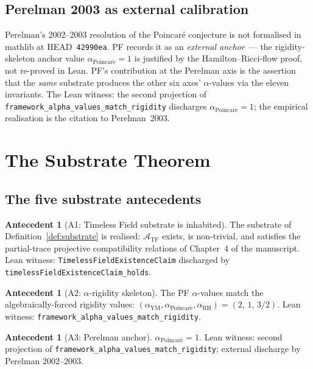 \documentclass[11pt,a4paper]{article}
\theoremstyle{definition}
\newtheorem{antecedent}[theorem]{Antecedent}
\theoremstyle{remark}
\newcommand{\TF}{\mathcal{A}_{\mathrm{TF}}}
\newcommand{\alphaRH}{\alpha_{\mathrm{RH}}}
\newcommand{\alphaYM}{\alpha_{\mathrm{YM}}}
\newcommand{\alphaP}{\alpha_{\mathrm{Poincar\acute{e}}}}
\newcommand{\lean}[1]{\texttt{\small #1}}
\begin{document}
\subsection{Perelman 2003 as external calibration}

Perelman's 2002--2003 resolution of the Poincar\'e conjecture is
not formalised in mathlib at HEAD~\texttt{42990ea}. PF records it
as an \emph{external anchor}~--- the rigidity-skeleton anchor
value $\alphaP = 1$ is justified by the
Hamilton--Ricci-flow proof, not re-proved in Lean. PF's
contribution at the Perelman axis is the assertion that the
\emph{same} substrate produces the other six axes' $\alpha$-values
via the eleven invariants. The Lean witness:
the second projection of \lean{framework\_alpha\_values\_match\_rigidity}
discharges $\alphaP = 1$; the empirical realisation is the citation
to Perelman~2003.

\section{The Substrate Theorem}
\label{sec:substrate-theorem}

\subsection{The five substrate antecedents}
\label{sec:antecedents}

\begin{antecedent}[A1: Timeless Field substrate is inhabited]
The substrate of Definition~\ref{def:substrate} is realised:
$\TF$ exists, is non-trivial, and satisfies the partial-trace
projective compatibility relations of Chapter~4 of the manuscript.
Lean witness:
\lean{TimelessFieldExistenceClaim} discharged by
\lean{timelessFieldExistenceClaim\_holds}.
\end{antecedent}

\begin{antecedent}[A2: $\alpha$-rigidity skeleton]
The PF $\alpha$-values match the algebraically-forced rigidity
values: $(\alphaYM, \alphaP, \alphaRH) = (2,\, 1,\, 3/2)$. Lean
witness: \lean{framework\_alpha\_values\_match\_rigidity}.
\end{antecedent}

\begin{antecedent}[A3: Perelman anchor]
$\alphaP = 1$. Lean witness: second projection of
\lean{framework\_alpha\_values\_match\_rigidity};
external discharge by Perelman 2002--2003.
\end{antecedent}
\end{document}
